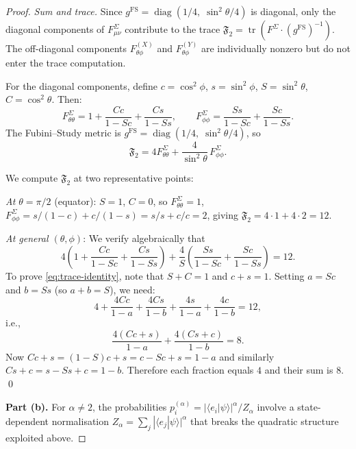 \documentclass[12pt,a4paper]{article}
\theoremstyle{definition}
\newcommand{\tr}{\operatorname{tr}}
\newcommand{\diag}{\operatorname{diag}}
\newcommand{\ip}[2]{\langle #1 | #2 \rangle}
\begin{document}
\begin{proof}
\medskip\noindent
\textit{Sum and trace.} Since $g^{\mathrm{FS}}
= \diag(1/4,\; \sin^2\!\theta/4)$ is diagonal, only the diagonal
components of $F^{\Sigma}_{\mu\nu}$ contribute to the trace
$\mathfrak{F}_2 = \tr(F^\Sigma \cdot (g^{\mathrm{FS}})^{-1})$.
The off-diagonal components $F^{(X)}_{\theta\phi}$ and
$F^{(Y)}_{\theta\phi}$ are individually nonzero but do not enter the
trace computation.

For the diagonal components, define
$c = \cos^2\phi$, $s = \sin^2\phi$, $S = \sin^2\theta$,
$C = \cos^2\theta$. Then:
\begin{equation}
  F^{\Sigma}_{\theta\theta}
  = 1 + \frac{Cc}{1 - Sc} + \frac{Cs}{1 - Ss},
  \qquad
  F^{\Sigma}_{\phi\phi}
  = \frac{Ss}{1 - Sc} + \frac{Sc}{1 - Ss}.
\end{equation}
The Fubini--Study metric is
$g^{\mathrm{FS}} = \diag(1/4,\; \sin^2\theta/4)$, so
\begin{equation}
  \mathfrak{F}_2
  = 4 F^{\Sigma}_{\theta\theta}
    + \frac{4}{\sin^2\theta}\, F^{\Sigma}_{\phi\phi}.
\end{equation}

We compute $\mathfrak{F}_2$ at two representative points:

\textit{At $\theta = \pi/2$} (equator): $S = 1$, $C = 0$, so
$F^\Sigma_{\theta\theta} = 1$,
$F^\Sigma_{\phi\phi} = s/(1-c) + c/(1-s) = s/s + c/c = 2$,
giving $\mathfrak{F}_2 = 4 \cdot 1 + 4 \cdot 2 = 12$. \checkmark

\textit{At general $(\theta, \phi)$}: We verify algebraically that
\begin{equation}
  \label{eq:trace-identity}
  4\!\left(1 + \frac{Cc}{1-Sc} + \frac{Cs}{1-Ss}\right)
  + \frac{4}{S}\!\left(\frac{Ss}{1-Sc} + \frac{Sc}{1-Ss}\right)
  = 12.
\end{equation}
To prove \eqref{eq:trace-identity}, note that $S + C = 1$ and
$c + s = 1$. Setting $a = Sc$ and $b = Ss$ (so $a + b = S$), we need:
\begin{equation}
  4 + \frac{4C c}{1-a} + \frac{4Cs}{1-b}
  + \frac{4s}{1-a} + \frac{4c}{1-b} = 12,
\end{equation}
i.e.,
\begin{equation}
  \frac{4(Cc + s)}{1 - a} + \frac{4(Cs + c)}{1 - b} = 8.
\end{equation}
Now $Cc + s = (1-S)c + s = c - Sc + s = 1 - a$ and similarly
$Cs + c = s - Ss + c = 1 - b$. Therefore each fraction equals $4$
and their sum is $8$. \qed

\medskip\noindent
\textbf{Part (b).}
For $\alpha \neq 2$, the probabilities
$p_i^{(\alpha)} = |\ip{e_i}{\psi}|^\alpha / Z_\alpha$ involve a
state-dependent normalisation
$Z_\alpha = \sum_j |\ip{e_j}{\psi}|^\alpha$ that breaks the quadratic
structure exploited above.


\end{proof}
\end{document}
